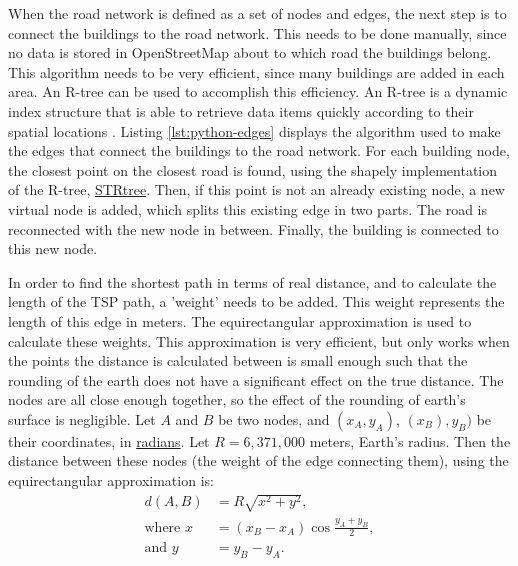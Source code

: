 When the road network is defined as a set of nodes and edges, the next step is to connect the buildings
to the road network. This needs to be done manually, since no data is stored in OpenStreetMap 
about to which road the buildings belong. This algorithm needs to be very efficient, since many 
buildings are added in each area. An R-tree can be used to accomplish this efficiency.
An R-tree is a dynamic index structure that is able to retrieve data items quickly according to 
their spatial locations \citep{guttman1984r}. Listing \ref{lst:python-edges} displays the algorithm
used to make the edges that connect the buildings to the road network. For each building node,
the closest point on the closest road is found, using the shapely implementation of the R-tree,
\url{STRtree}. Then, if this point is not an already existing node, a new virtual node is added,
which splits this existing edge in two parts. The road is reconnected with the new node in between.
Finally, the building is connected to this new node.

In order to find the shortest path in terms of real distance, and to calculate the length of the 
TSP path, a 'weight' needs to be added. This weight represents the length of this edge in meters.
The equirectangular approximation is used to calculate these weights. This approximation is very
efficient, but only works when the points the distance is calculated between is small enough such
that the rounding of the earth does not have a significant effect on the true distance.
The nodes are all close enough together, so the effect of the 
rounding of earth's surface is negligible. Let $A$ and $B$ be two nodes,
and $(x_A,y_A)$, $(x_B),y_B)$ be their coordinates, in \url{radians}. Let $R=6,371,000$ meters, 
Earth's radius. Then the distance between these nodes (the weight of the edge connecting them),
using the equirectangular approximation is:
\begin{align}
  \label{eq:equirectangluar_approx}
  d(A,B)	&=R\sqrt{x^2+y^2},\\
  \text{where }x&=(x_B-x_A)\cos{\frac{y_A+y_B}{2}},\\
  \text{and }y	&=y_B-y_A.
\end{align}

